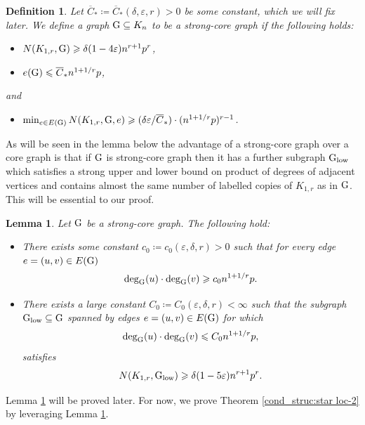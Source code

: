 \documentclass[a4paper,11pt,english,reqno]{amsart}
\numberwithin{equation}{section}
\renewcommand{\leq}{\leqslant}
\renewcommand{\geq}{\geqslant}
\newcommand{\cstar}{\overline{C}_{*}}
\newcommand{\glow}{\textup{G}_{\textup{low}}}
\newcommand{\tu}[1]{\textup{#1}}
\newtheorem{definition}[theorem]{Definition}
\newtheorem{lemma}[theorem]{Lemma}
\begin{document}
	\begin{definition}\label{def:sc-graph}
		Let $\cstar\coloneqq \cstar(\delta, \varepsilon,r)>0$ be some constant, which we will fix later. We define a graph $\tu{G}\subseteq K_{n}$ to be a \textit{strong-core} graph if the following holds:
		\begin{itemize}
			\item[(SC1)] $N(K_{1,r}, \tu{G})\geq \delta(1-4\varepsilon) n^{r+1}p^{r}$,
			\item[(SC2)]$e(\tu{G})\leq \cstar n^{1+1/r}p$,
		\end{itemize}
		and
		\begin{itemize}
			\item[(SC3)]$\min_{e\in E(\tu{G})} N(K_{1,r}, \tu{G}, e)\geq (\delta \varepsilon/\cstar)\cdot (n^{1+1/r}p)^{r-1}$. 
		\end{itemize}
	\end{definition}
	
	As will be seen in the lemma below the advantage of a strong-core graph over a core graph is that if %
	$\tu{G}$ is strong-core graph then it has a further subgraph $\glow$ which satisfies a strong upper and lower bound on product of degrees of adjacent vertices and contains almost the same number of labelled copies of $K_{1,r}$ as in $\tu{G}$. This will be essential to our proof.
	
	
	\begin{lemma}
		\label{glow properties}
		Let $\tu{G}$ be a strong-core graph. %
		The following hold:
		\begin{itemize}
			\item[(i)] There exists some constant $c_{0}\coloneqq c_{0}(\varepsilon, \delta, r)>0$ such that for every edge $e=(u,v)\in E(\tu{G})$
			\begin{equation}
				\label{product of deg:strong bound}
				\tu{deg}_{\tu{G}}(u)\cdot \tu{deg}_{\tu{G}}(v) \geq c_{0}n^{1+1/r}p.
			\end{equation}
			\item[(ii)] There exists a large constant $C_{0}\coloneqq C_{0}(\varepsilon, \delta, r) <\infty$ such that the subgraph $\glow\subseteq \tu{G}$ spanned by edges $e=(u,v)\in E(\tu{G})$ for which
			\begin{equation}
				\label{product of deg:upper bound}
				\tu{deg}_{\tu{G}}(u)\cdot \tu{deg}_{\tu{G}}(v) \leq C_{0}n^{1+1/r}p, 
			\end{equation}
			satisfies
			\begin{equation}
				\label{glow contains almost all copies}
				N(K_{1,r}, \glow)\geq \delta(1-5\varepsilon)n^{r+1}p^{r}.
			\end{equation}
		\end{itemize}
	\end{lemma}
	Lemma \ref{glow properties} will be proved later. For now, we prove Theorem \ref{cond_struc:star loc-2} by leveraging Lemma \ref{glow properties}.
	
\end{document}

